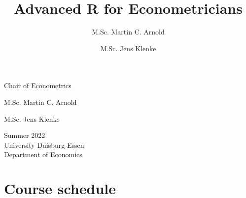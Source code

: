 \documentclass[]{article}
\author{\Large M.Sc. Martin C.
Arnold\vspace{0.05in} \newline\normalsize\emph{}   \and \Large M.Sc.
Jens Klenke\vspace{0.05in} \newline\normalsize\emph{}  }
\title{\center Advanced R for Econometricians \\[1em]\smaller{Semester
overview}  }
\date{}
\begin{document}
	
%    


{%

{

\vskip 40pt\relax \normalsize\fontsize{11}{12}

\begin{minipage}[t]{.49\textwidth}
Chair of Econometrics

M.Sc. Martin C. Arnold \hskip 15pt \emph{\small }   \par M.Sc. Jens
Klenke \hskip 15pt \emph{\small }   
\end{minipage}%
%
\hfill
%
\begin{minipage}[t]{.49\textwidth}
  \begin{flushright}
    Summer 2022\\
    University Duisburg-Essen\\
    Department of Economics\\
  \end{flushright}
\end{minipage}

\vspace{20pt}

}

\setlength{\parindent}{0pt}
\thispagestyle{plain}
{\fontsize{10}{10}\selectfont\raggedright 
{\let\newpage\relax\maketitle}

}


}

\vskip 8.5pt





\vskip 6.5pt


\noindent  \hypertarget{course-schedule}{%
\section{Course schedule}\label{course-schedule}}
\end{document}
